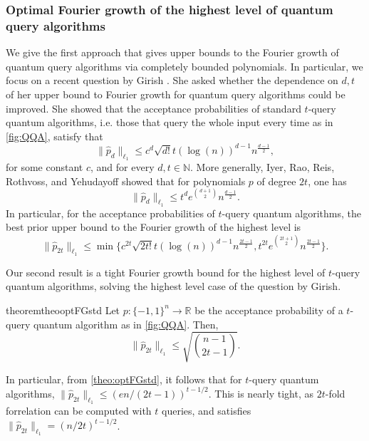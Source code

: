 \documentclass[11pt]{article}
\newcommand{\norm}[1]{\|#1\|}
\newcommand{\N}{\mathbb{N}} %
\newcommand{\1}{\mathbf{1}}
\theoremstyle{plain}
\theoremstyle{definition}
\theoremstyle{remark}
\begin{document}
\subsubsection{Optimal Fourier growth of the highest level of quantum query algorithms}
We give the first approach that gives upper bounds to the Fourier growth of quantum query algorithms via completely bounded polynomials. In particular, we focus on a recent question by Girish \cite[Question 4]{girish2026fourier}. She asked whether the dependence on $d,t$ of her upper bound to Fourier growth for quantum query algorithms could be improved. She showed that the acceptance probabilities of standard $t$-query quantum algorithms, i.e. those that query the whole input every time as in \cref{fig:QQA}, satisfy that 
\begin{equation*}\label{eq:UmasBound}
    \norm{\widehat p_{d}}_{\ell_1}\leq c^{d}\sqrt{d!}t(\log(n))^{d-1}n^{\frac{d-1}{2}},
\end{equation*}
for some constant $c$, and for every $d,t\in\N$. More generally, Iyer, Rao, Reis, Rothvoss, and Yehudayoff showed that for polynomials $p$ of degree $2t$, one has \cite{iyer2021tight}
\begin{equation*}\label{eq:IyersBound}
    \norm{\widehat p_{d}}_{\ell_1}\leq t^de^{{d+1\choose 2}} n^{\frac{d-1}{2}}.
\end{equation*}
In particular, for the acceptance probabilities of $t$-query quantum algorithms, the best prior upper bound to the Fourier growth of the highest level is 
\begin{equation}\label{eq:2tgrowth}
    \norm{\widehat p_{2t}}_{\ell_1}\leq \min\{ c^{2t}\sqrt{2t!}t(\log(n))^{d-1}n^{\frac{2t-1}{2}}, t^{2t}e^{{2t+1\choose 2}} n^{\frac{2t-1}{2}}\}.
\end{equation}

Our second result is a tight Fourier growth bound for the highest level of $t$-query quantum algorithms, solving the highest level case of the question by Girish. 

\begin{restatable}{theorem}{theooptFGstd}\label{theo:optFGstd}
    Let $p:\{-1,1\}^n\to \mathbb{R}$ be the acceptance probability of a $t$-query quantum algorithm as in \cref{fig:QQA}. Then, 
   \begin{equation*}
        \norm{\widehat p_{2t}}_{\ell_1}\leq \sqrt{{n-1\choose 2t-1}}.
\end{equation*}  
\end{restatable}

In particular, from \cref{theo:optFGstd}, it follows that for $t$-query quantum algorithms, $\norm{\widehat p_{2t}}_{\ell_1}\leq (en/(2t-1))^{t-1/2}$. This is nearly tight, as $2t$-fold forrelation can be computed with $t$ queries, and satisfies $\norm{\widehat p_{2t}}_{\ell_1}=(n/2t)^{t-1/2}$.
\end{document}
